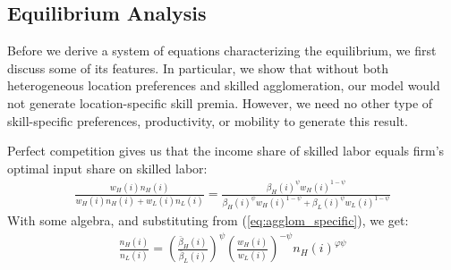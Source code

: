 \documentclass[12 pt]{article}
\begin{document}
\vspace{5mm}
\subsection{Equilibrium Analysis}

Before we derive a system of equations characterizing the equilibrium, we first discuss some of its features.  In particular, we show that without both heterogeneous location preferences and skilled agglomeration, our model would not generate location-specific skill premia.  However, we need no other type of skill-specific preferences, productivity, or mobility to generate this result.

Perfect competition gives us that the income share of skilled labor equals firm's optimal input share on skilled labor:
\begin{eqnarray}
\frac{w_H(i) n_H(i)}{w_H(i) n_H(i) + w_L(i) n_L(i)}  = \frac{\beta_H(i)^{\psi} w_H(i)^{1-\psi}}{\beta_H(i)^{\psi} w_H(i)^{1-\psi} + \beta_L(i)^{\psi} w_L(i)^{1-\psi}} \nonumber
\end{eqnarray}
With some algebra, and substituting from (\ref{eq:agglom_specific}), we get:
\begin{eqnarray}\label{eq:labor_demand}
    \frac{n_H(i)}{n_L(i)} = \left(\frac{\bar{\beta}_H(i)}{\bar{\beta}_L(i)}\right)^\psi \left(\frac{w_H(i)}{w_L(i)}\right)^{-\psi} n_H(i)^{\varphi \psi }
\end{eqnarray}
\end{document}
